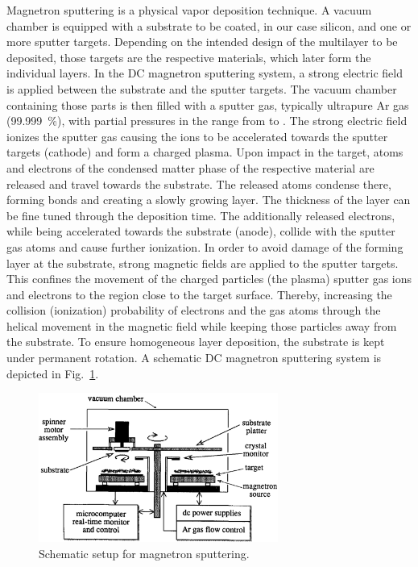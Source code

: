 Magnetron sputtering is a physical vapor deposition technique. A vacuum chamber is equipped with a substrate to be coated, in our case silicon, and one or more sputter targets. Depending on the intended design of the multilayer to be deposited, those targets are the respective materials, which later form the individual layers. In the DC magnetron sputtering system, a strong electric field is applied between the substrate and the sputter targets. The vacuum chamber containing those parts is then filled with a sputter gas, typically ultrapure Ar gas (\SI{99.999}{\percent}), with partial pressures in the range from  to  \cite{stearns_fabrication_1991}. The strong electric field ionizes the sputter gas causing the ions to be accelerated towards the sputter targets (cathode) and form a charged plasma. Upon impact in the target, atoms and electrons of the condensed matter phase of the respective material are released and travel towards the substrate. The released atoms condense there, forming bonds and creating a slowly growing layer. The thickness of the layer can be fine tuned through the deposition time. The additionally released electrons, while being accelerated towards the substrate (anode), collide with the sputter gas atoms and cause further ionization. In order to avoid damage of the forming layer at the substrate, strong magnetic fields are applied to the sputter targets. This confines the movement of the charged particles (the plasma) sputter gas ions and electrons to the region close to the target surface. Thereby, increasing the collision (ionization) probability of electrons and the gas atoms through the helical movement in the magnetic field while keeping those particles away from the substrate. To ensure homogeneous layer deposition, the substrate is kept under permanent rotation. A schematic DC magnetron sputtering system is depicted in Fig.~\ref{ch_exp:magnetron_sputtering_schematic}.
\begin{figure}[htb]
        \includegraphics[width=0.7\textwidth]{img/magnetron_sputtering_schematic.png}
        \caption[Schematic setup for magnetron sputtering.]{%
            Schematic setup for magnetron sputtering.}
        \label{ch_exp:magnetron_sputtering_schematic}
\end{figure}


